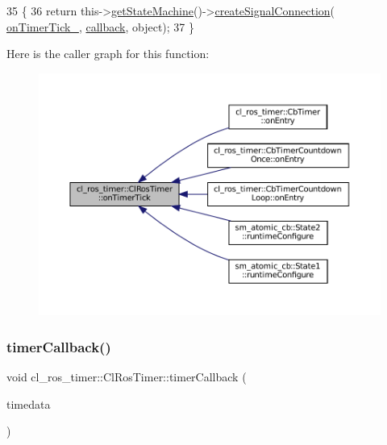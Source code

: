 \begin{DoxyCode}
35     \{
36         \textcolor{keywordflow}{return} this->\hyperlink{classsmacc_1_1ISmaccClient_aec51d4712404cb9882b86e4c854bb93a}{getStateMachine}()->\hyperlink{classsmacc_1_1ISmaccStateMachine_adf0f42ade0c65cc471960fe2a7c42da2}{createSignalConnection}(
      \hyperlink{classcl__ros__timer_1_1ClRosTimer_a2fcaab287b6ee13f6cc689876c6d28fa}{onTimerTick\_}, \hyperlink{sm__ridgeback__barrel__search__1_2servers_2opencv__perception__node_2opencv__perception__node_8cpp_a050e697bd654facce10ea3f6549669b3}{callback}, \textcolor{keywordtype}{object});
37     \}
\end{DoxyCode}
Here is the caller graph for this function\+:
\nopagebreak
\begin{figure}[H]
\begin{center}
\leavevmode
\includegraphics[width=350pt]{classcl__ros__timer_1_1ClRosTimer_a7edcc057bfb5a25fe0892755137dd8da_icgraph}
\end{center}
\end{figure}
\mbox{\label{classcl__ros__timer_1_1ClRosTimer_a047720c2f37e354e0867b148c85e18e3}} 
\subsubsection{\texorpdfstring{timer\+Callback()}{timerCallback()}}
{\footnotesize\ttfamily void cl\+\_\+ros\+\_\+timer\+::\+Cl\+Ros\+Timer\+::timer\+Callback (\begin{DoxyParamCaption}\item[{const ros\+::\+Timer\+Event \&}]{timedata }\end{DoxyParamCaption})\hspace{0.3cm}{\ttfamily [protected]}}



